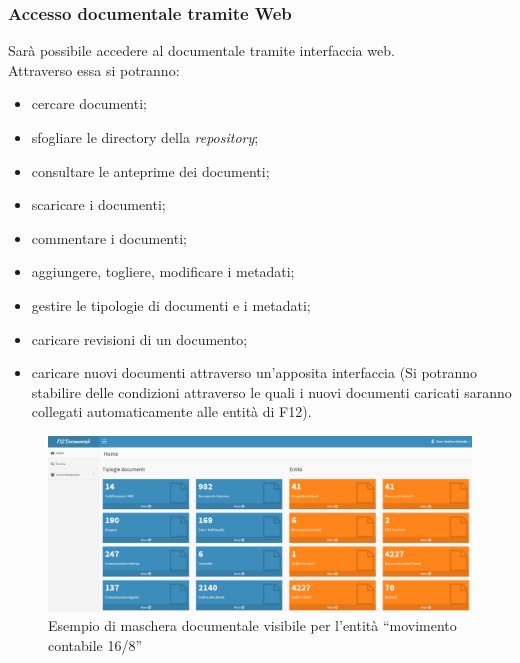         \subsubsection{Accesso documentale tramite Web}
        Sarà possibile accedere al documentale tramite interfaccia web.
        \\
        Attraverso essa si potranno:
        \begin{itemize}
            \item cercare documenti;
            
            \item sfogliare le directory della \textit{repository};
            
            \item consultare le anteprime dei documenti;
            
            \item scaricare i documenti;
            
            \item commentare  i documenti;
            
            \item aggiungere, togliere, modificare i metadati;
            
            \item gestire le tipologie di documenti e i metadati;
            
            \item caricare revisioni di un documento;
            
            \item caricare nuovi documenti attraverso un'apposita interfaccia (Si potranno stabilire delle condizioni attraverso le quali i nuovi documenti caricati saranno collegati automaticamente alle entità di F12).
        \end{itemize}
        \begin{figure}[!h] 
            \centering 
            \includegraphics[width=1\columnwidth]{immagini/f12doc/4.png}
            \caption{Esempio di maschera documentale visibile per l'entità “movimento contabile 16/8”}
        \end{figure}